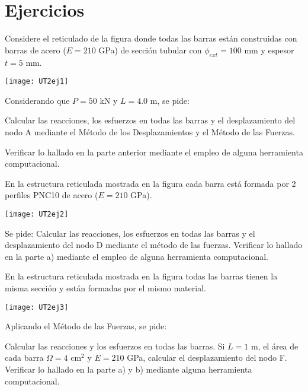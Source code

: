 \newpage
\section{Ejercicios}
\setcounter{ejercicio}{0}

\ejercicio


Considere el reticulado de la figura donde todas las barras están construidas con barras de acero ($E=210$ GPa) de sección tubular con $\phi_{ext} =100$ mm y espesor $t=5$ mm. 

\begin{center}
\texttt{[image: UT2ej1]}
\end{center}

Considerando que $P=50$ kN y $L=4.0$ m, se pide:

\parte Calcular las reacciones, los esfuerzos en todas las barras y el desplazamiento del nodo A mediante el Método de los Desplazamientos y el Método de las Fuerzas.

\parte Verificar lo hallado en la parte anterior mediante el empleo de alguna herramienta computacional.




\ejercicio

En la estructura reticulada mostrada en la figura cada barra está formada por 2 perfiles PNC10 de acero ($E=210$ GPa).

\begin{center}
	\texttt{[image: UT2ej2]}
\end{center}

Se pide:
%
\parte Calcular las reacciones, los esfuerzos en todas las barras y el desplazamiento del nodo D mediante el método de las fuerzas.
%
\parte Verificar lo hallado en la parte a) mediante el empleo de alguna herramienta computacional.




\ejercicio

En la estructura reticulada mostrada en la figura todas las barras tienen la misma sección y están formadas por el mismo material. %

\begin{center}
	\texttt{[image: UT2ej3]}
\end{center}

Aplicando el Método de las Fuerzas, se pide:

\parte Calcular las reacciones y los esfuerzos en todas las barras.
%
\parte Si $L=1$ m, el área de cada barra $\Omega=4$ cm$^2$ y $E=210$ GPa, calcular el desplazamiento del nodo F.
%
\parte Verificar lo hallado en la parte a) y b) mediante alguna herramienta computacional.


